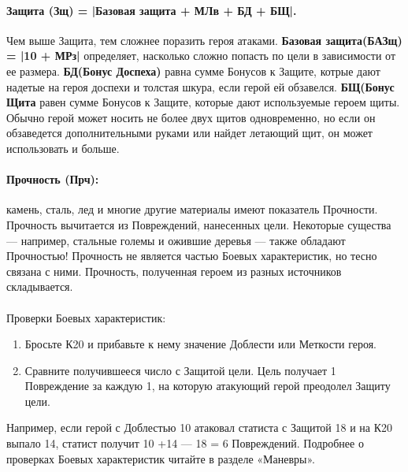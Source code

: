 \paragraph{Защита (Зщ) = |Базовая защита + МЛв + БД + БЩ|.} Чем выше Защита, тем сложнее поразить героя атаками.
\newline \textbf{Базовая защита(БАЗщ) = |10 + МРз|} определяет, насколько сложно попасть по цели в зависимости от ее размера.
\newline \textbf{БД(Бонус Доспеха)} равна сумме Бонусов к Защите, котрые дают надетые на героя доспехи и толстая шкура, если герой ей обзавелся.
\newline \textbf{БЩ(Бонус Щита} равен сумме Бонусов к Защите, которые дают используемые героем щиты. Обычно герой может носить не более двух щитов одновременно, но если он обзаведется дополнительными руками или найдет летающий щит, он может использовать и больше.
\paragraph{Прочность (Прч):} камень, сталь, лед и многие другие материалы имеют показатель Прочности. Прочность вычитается из Повреждений, нанесенных цели. Некоторые существа — например, стальные големы и ожившие деревья — также обладают Прочностью! Прочность не является частью Боевых характеристик, но тесно связана с ними.
\newline Прочность, полученная героем из разных источников складывается.
\paragraph{}Проверки Боевых характеристик:
\begin{enumerate}
\item Бросьте К20 и прибавьте к нему значение Доблести или Меткости героя.
\item Сравните получившееся число с Защитой цели. Цель получает 1 Повреждение за каждую 1, на которую атакующий герой преодолел Защиту цели.
\end{enumerate}
Например, если герой с Доблестью 10 атаковал статиста с Защитой 18 и на К20 выпало 14, статист получит 10 +14 — 18 = 6 Повреждений.
\newline
Подробнее о проверках Боевых характеристик читайте в разделе «Маневры».
